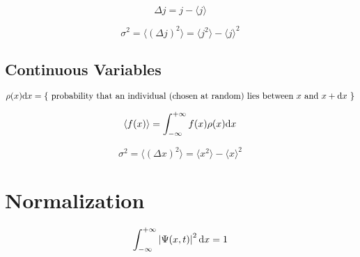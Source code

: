 \begin{equation*}
\Delta j = j-\langle j\rangle
\end{equation*}

\begin{equation*}
\sigma^2=\langle (\Delta j)^2 \rangle = \langle j^2 \rangle - \langle j \rangle ^2
\end{equation*}

\subsection{Continuous Variables}

\begin{equation*}
\rho(x)\mathrm{d} x = \left\lbrace\text{ probability that an individual (chosen at random) lies between $x$ and $x+\mathrm{d} x$ }\right\rbrace 
\end{equation*}

\begin{equation*}
\langle f(x)\rangle = \int_{-\infty}^{+\infty} f(x)\rho(x)\mathrm{d} x
\end{equation*}

\begin{equation*}
	\sigma^2=\langle (\Delta x)^2 \rangle = \langle x^2 \rangle - \langle x \rangle ^2
\end{equation*}

\section{Normalization}

\begin{equation*}
\int_{-\infty}^{+\infty}\left| \Psi(x,t) \right|^2 \mathrm{d} x = 1
\end{equation*}